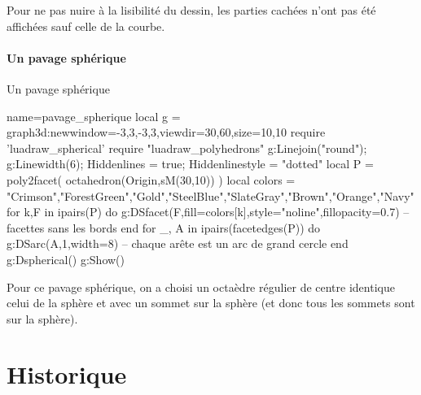 Pour ne pas nuire à la lisibilité du dessin, les parties cachées n'ont pas été affichées sauf celle de la courbe.

\paragraph{Un pavage sphérique}

\begin{demo}{Un pavage sphérique}
\begin{luadraw}{name=pavage_spherique}
local g = graph3d:new{window={-3,3,-3,3},viewdir={30,60},size={10,10}}
require 'luadraw_spherical'
require "luadraw_polyhedrons"
g:Linejoin("round"); g:Linewidth(6); Hiddenlines = true; Hiddenlinestyle = "dotted"
local P = poly2facet( octahedron(Origin,sM(30,10)) )
local colors = {"Crimson","ForestGreen","Gold","SteelBlue","SlateGray","Brown","Orange","Navy"}
for k,F in ipairs(P) do
    g:DSfacet(F,{fill=colors[k],style="noline",fillopacity=0.7})  -- facettes sans les bords
end
for _, A in ipairs(facetedges(P)) do
    g:DSarc(A,1,{width=8}) -- chaque arête est un arc de grand cercle
end
g:Dspherical()
g:Show()
\end{luadraw}
\end{demo}

Pour ce pavage sphérique, on a choisi un octaèdre régulier de centre identique celui de la sphère et avec un sommet sur la sphère (et donc tous les sommets sont sur la sphère).

\section{Historique}

